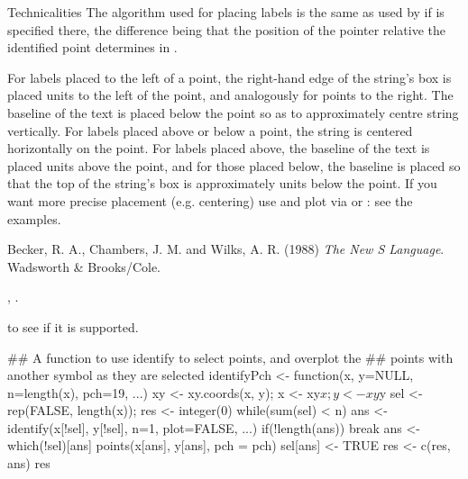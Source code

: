 %
\begin{Section}{Technicalities}
The algorithm used for placing labels is the same as used by
 if  is specified there, the difference being
that the position of the pointer relative the identified point
determines  in .

For labels placed to the left of a point, the right-hand edge of the
string's box is placed  units to the left of the point,
and analogously for points to the right.  The baseline of the text is
placed below the point so as to approximately centre string vertically.
For labels placed above or below a point, the string is centered
horizontally on the point.  For labels placed above, the baseline of
the text is placed  units above the point, and
for those placed below, the baseline is placed so that the top
of the string's box is approximately  units below the
point.  If you want more precise placement (e.g. centering) use
 and plot via  or
: see the examples.
\end{Section}
%
\begin{References}\relax
Becker, R. A., Chambers, J. M. and Wilks, A. R. (1988)
\emph{The New S Language}.
Wadsworth \& Brooks/Cole.
\end{References}
%
\begin{SeeAlso}\relax
{}, .

 to see if it is supported.
\end{SeeAlso}
%
\begin{Examples}
\begin{ExampleCode}
## A function to use identify to select points, and overplot the
## points with another symbol as they are selected
identifyPch <- function(x, y=NULL, n=length(x), pch=19, ...)
{
    xy <- xy.coords(x, y); x <- xy$x; y <- xy$y
    sel <- rep(FALSE, length(x)); res <- integer(0)
    while(sum(sel) < n) {
        ans <- identify(x[!sel], y[!sel], n=1, plot=FALSE, ...)
        if(!length(ans)) break
        ans <- which(!sel)[ans]
        points(x[ans], y[ans], pch = pch)
        sel[ans] <- TRUE
        res <- c(res, ans)
    }
    res
}
\end{ExampleCode}
\end{Examples}
